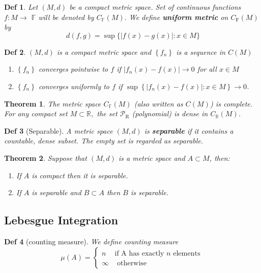 \documentclass[10pt]{paper}
\newtheorem{theorem}{Theorem}[section]
\newtheorem{definition}{Def}[section]
\begin{document}
\begin{definition}
    Let $(M, d)$ be a compact metric space. Set of continuous functions $f: M \rightarrow$ $\mathbb{F}$ will be denoted by $C_{\mathbb{F}}(M) .$ We define \textbf{uniform metric} on $C_{\mathrm{F}}(M)$ by
    $$
        d(f, g)=\sup \{|f(x)-g(x)|: x \in M\}
    $$
\end{definition}

\begin{definition}
    $(M, d)$ is a compact metric space and $\left\{f_{n}\right\}$ is a sequence in $C(M)$
    \begin{enumerate}
        \item $\left\{f_{n}\right\}$ converges pointwise to $f$ if $\left|f_{n}(x)-f(x)\right| \rightarrow 0$ for all $x \in M$
        \item $\left\{f_{n}\right\}$ converges uniformly to $f$ if $\sup \left\{\left|f_{n}(x)-f(x)\right|: x \in M\right\} \rightarrow 0$.
    \end{enumerate}
\end{definition}

\begin{theorem}
    The metric space $C_{\mathbb{F}}(M)$ (also written as $C(M)$) is complete. For any compact set $M \subset \mathbb{R},$ the set $\mathcal{P}_{\mathrm{R}}$ (polynomial) is dense in $C_{\mathbb{R}}(M)$.
\end{theorem}

\begin{definition}[Separable]
    A metric space $(M, d)$ is \textbf{separable} if it contains a countable, dense subset. The empty set is regarded as separable.
\end{definition}

\begin{theorem}
    Suppose that $(M, d)$ is a metric space and $A \subset M$, then:
    \begin{enumerate}
        \item If $A$ is compact then it is separable.
        \item If $A$ is separable and $B \subset A$ then $B$ is separable.
    \end{enumerate}
\end{theorem}

\subsection{Lebesgue Integration}

\begin{definition}[counting measure]
    We define counting measure
    $$\mu(A)=\left\{\begin{array}{ll}
            n      & \text{if A has exactly } n \text { elements } \\
            \infty & \text { otherwise }
        \end{array}\right.$$
\end{definition}
\end{document}

